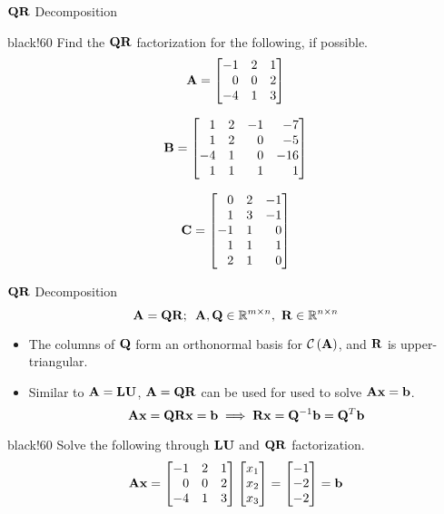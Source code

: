 \documentclass[aspectratio=169]{beamer}
\def\mf{\ensuremath\mathbf}
\def\mb{\ensuremath\mathbb}
\def\mc{\ensuremath\mathcal}
\def\lp{\ensuremath\left(}
\def\rp{\ensuremath\right)}
\newcommand{\demoex}[2]{\onslide<#1->\begin{color}{black!60} #2 \end{color}}
\begin{document}
\begin{frame}{$\mf{QR}$ Decomposition}

\begin{color}{black!60}
Find the $\mf{QR}$ factorization for the following, if possible.
$$\mf{A} = \begin{bmatrix*}[r]
-1 & 2 & 1\\
 0 & 0 & 2\\
-4 & 1 & 3\\
\end{bmatrix*}$$

$$\mf{B} = \begin{bmatrix*}[r]
1 & 2 & -1 & -7 \\
1 & 2 & 0 & -5 \\
-4 & 1 & 0 & -16 \\
1 & 1 & 1 & 1 \\
\end{bmatrix*}$$

$$\mf{C} = \begin{bmatrix*}[r]
0 & 2 & -1 \\
1 & 3 & -1 \\
-1 & 1 & 0 \\
1 & 1 & 1 \\
2 & 1 & 0 \\
\end{bmatrix*}$$
\end{color}

\end{frame}


\begin{frame}[t]{$\mf{QR}$ Decomposition}
$$\mf{A} = \mf{QR}; \,\,\, \mf{A}, \mf{Q} \in \mb{R}^{m \times n},\,\, \mf{R} \in \mb{R}^{n \times n}$$
\begin{itemize}
    \item The columns of $\mf{Q}$ form an orthonormal basis for $\mc{C}\lp \mf{A}\rp$, and $\mf{R}$ is upper-triangular.
    \item Similar to $\mf{A} = \mf{LU}$, $\mf{A} = \mf{QR}$ can be used for used to solve $\mf{Ax} = \mf{b}$.
    \[ \mf{Ax} = \mf{QRx} = \mf{b} \implies \mf{Rx} = \mf{Q}^{-1}\mf{b} = \mf{Q}^T\mf{b} \]
\end{itemize}

\demoex{2}{
Solve the following through $\mf{LU}$ and $\mf{QR}$ factorization. 
$$\mf{Ax} = \begin{bmatrix*}[r]
-1 & 2 & 1\\
 0 & 0 & 2\\
-4 & 1 & 3\\
\end{bmatrix*}\begin{bmatrix*}[r]
x_1\\
x_2\\
x_3\\
\end{bmatrix*} = \begin{bmatrix*}[r]
-1\\
-2\\
-2\\
\end{bmatrix*} = \mf{b}$$
}
\end{frame}
\end{document}
